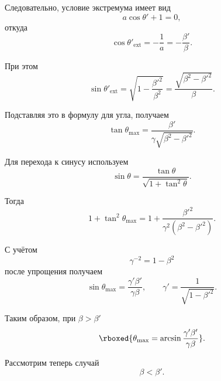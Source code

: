 \documentclass[../final.tex]{subfiles}
\begin{document}
Следовательно, условие экстремума имеет вид
%
\begin{equation*}
    a\cos\theta'+1=0,
\end{equation*}
%
откуда
%
\begin{equation*}
    \cos\theta'_{\mathrm{ext}}
    =
    -\frac{1}{a}
    =
    -\frac{\beta'}{\beta}.
\end{equation*}

При этом
%
\begin{equation*}
    \sin\theta'_{\mathrm{ext}}
    =
    \sqrt{
        1-\frac{\beta'^2}{\beta^2}
    }
    =
    \frac{
        \sqrt{\beta^2-\beta'^2}
    }{\beta}.
\end{equation*}

Подставляя это в формулу для угла, получаем
%
\begin{equation*}
    \tan\theta_{\max}
    =
    \frac{
        \beta'
    }{
        \gamma\sqrt{\beta^2-\beta'^2}
    }.
\end{equation*}

Для перехода к синусу используем
%
\begin{equation*}
    \sin\theta
    =
    \frac{\tan\theta}{
        \sqrt{1+\tan^2\theta}
    }.
\end{equation*}

Тогда
%
\begin{equation*}
    1+\tan^2\theta_{\max}
    =
    1+
    \frac{
        \beta'^2
    }{
        \gamma^2(\beta^2-\beta'^2)
    }.
\end{equation*}

С учётом
%
\begin{equation*}
    \gamma^{-2}=1-\beta^2
\end{equation*}
%
после упрощения получаем
%
\begin{equation*}
    \sin\theta_{\max}
    =
    \frac{
        \gamma'\beta'
    }{
        \gamma\beta
    },
    \qquad
    \gamma'
    =
    \frac{1}{\sqrt{1-\beta'^2}}.
\end{equation*}

Таким образом, при $\beta>\beta'$
%
\begin{equation*}
    \rboxed{
        \theta_{\max}
        =
        \arcsin
        \frac{
            \gamma'\beta'
        }{
            \gamma\beta
        }
    }.
\end{equation*}

Рассмотрим теперь случай
%
\begin{equation*}
    \beta<\beta'.
\end{equation*}
\end{document}
